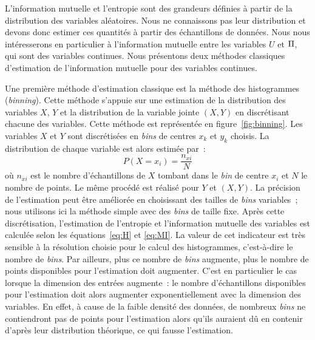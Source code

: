 \documentclass[../main]{subfiles}
\begin{document}
L'information mutuelle et l'entropie sont des grandeurs définies à partir de la distribution des variables aléatoires. Nous ne connaissons pas leur distribution et devons donc estimer ces quantités à partir des échantillons de données. 
Nous nous intéresserons en particulier à l'information mutuelle entre les variables $U$ et $\Pi$, qui sont des variables continues. Nous présentons deux méthodes classiques d'estimation de l'information mutuelle pour des variables continues.


Une première méthode d'estimation classique est la méthode des histogrammes (\emph{binning}).
Cette méthode s'appuie sur une estimation de la distribution des variables $X$, $Y$ et la distribution de la variable jointe $(X,Y)$ en discrétisant chacune des variables.
Cette méthode est représentée en figure~\ref{fig:binning}. Les variables $X$ et $Y$ sont discrétisées en \emph{bins} de centres $x_k$ et $y_k$ choisis.
La distribution de chaque variable est alors estimée par~: 
$$P(X = x_i) = \frac{n_{xi}}{N} $$ où $n_{xi}$ est le nombre d'échantillons de $X$ tombant dans le \emph{bin} de centre $x_i$ et $N$ le nombre de points. Le même procédé est réalisé pour $Y$ et $(X,Y)$. La précision de l'estimation peut être améliorée en choisissant des tailles de \emph{bins} variables~; nous utilisons ici la méthode simple avec des \emph{bins} de taille fixe.
Après cette discrétisation, l'estimation de l'entropie et l'information mutuelle des variables est calculée selon les équations~\ref{eq:H} et \ref{eq:MI}.
La valeur de cet indicateur est très sensible à la résolution choisie pour le calcul des histogrammes, c'est-à-dire le nombre de \emph{bins}.
Par ailleurs, plus ce nombre de \emph{bins} augmente, plus le nombre de points disponibles pour l'estimation doit augmenter. C'est en particulier le cas lorsque la dimension des entrées augmente~:
le nombre d'échantillons disponibles pour l'estimation doit alors augmenter exponentiellement avec la dimension des variables. En effet, à cause de la faible densité des données, de nombreux \emph{bins} ne contiendront pas de points pour l'estimation alors qu'ils auraient dû en contenir d'après leur distribution théorique, ce qui fausse l'estimation.
\end{document}
